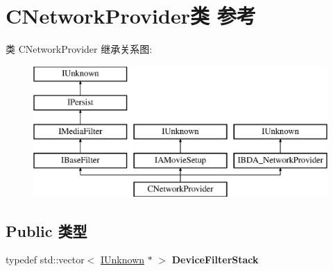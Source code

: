 \hypertarget{class_c_network_provider}{}\section{C\+Network\+Provider类 参考}
\label{class_c_network_provider}
类 C\+Network\+Provider 继承关系图\+:\begin{figure}[H]
\begin{center}
\leavevmode
\includegraphics[height=5.000000cm]{class_c_network_provider}
\end{center}
\end{figure}
\subsection*{Public 类型}
\begin{DoxyCompactItemize}
\item 
\mbox{\label{class_c_network_provider_a2050a864860e16d619afe54034451106}} 
typedef std\+::vector$<$ \hyperlink{interface_i_unknown}{I\+Unknown} $\ast$ $>$ {\bfseries Device\+Filter\+Stack}
\end{DoxyCompactItemize}
